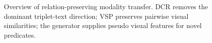 \begin{figure}[t]
\centering
\setlength{\fboxsep}{3pt}
\caption{Overview of relation-preserving modality transfer. DCR removes the
dominant triplet-text direction; VSP preserves pairwise visual similarities;
the generator supplies pseudo visual features for novel predicates.}
\label{fig:method}
\end{figure}
